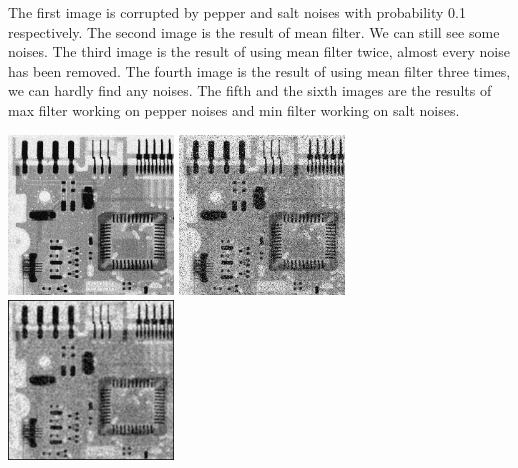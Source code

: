 \documentclass{article}
\begin{document}
The first image is corrupted by pepper and salt noises with probability 0.1 respectively. The second image is the result of mean filter. We can still see some noises. The third image is the result of using mean filter twice, almost every noise has been removed. The fourth image is the result of using mean filter three times, we can hardly find any noises. The fifth and the sixth images are the results of max filter working on pepper noises and min filter working on salt noises.

\includegraphics[width=0.33\textwidth]{../data/uniform_Circuit.jpg}
\includegraphics[width=0.33\textwidth]{../data/uniform_pepper_salt_Circuit.jpg}
\includegraphics[width=0.33\textwidth]{../data/arithmetic_mean_uniform_pepper_salt_Circuit.jpg}
\end{document}
